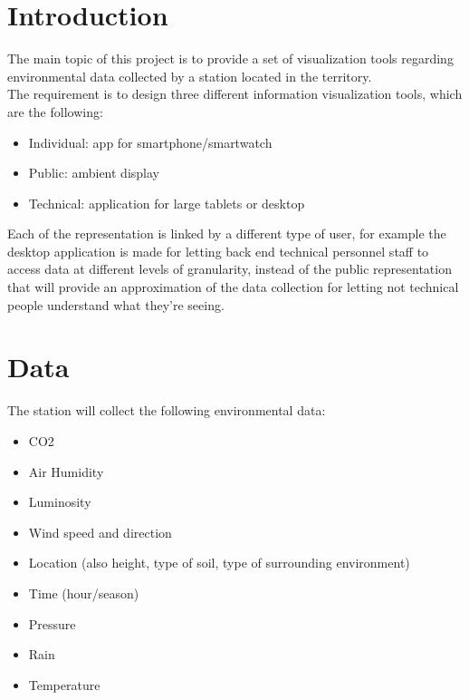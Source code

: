\documentclass[12pt]{article} %
\begin{document}



\tableofcontents %

\newpage %


\section{Introduction} %
The main topic of this project is to provide a set of visualization tools regarding environmental data collected by a station located in the territory.\\
The requirement is to design three different information visualization tools, which are the following:
\begin{itemize}
\item Individual: app for smartphone/smartwatch
\item Public: ambient display
\item Technical: application for large tablets or desktop
\end{itemize}
Each of the representation is linked by a different type of user, for example the desktop application is made for  letting back end technical personnel  staff to access data at different levels of granularity, instead of the public representation that will provide an approximation of the data collection for letting not technical people understand what they're seeing.\\
\section{Data}
The station will collect the following environmental data:
\begin{itemize}
\item CO2
\item Air Humidity
\item Luminosity
\item Wind speed and direction 
\item Location (also height, type of soil, type of surrounding environment)
\item Time (hour/season)
\item Pressure
\item Rain
\item Temperature
\end{itemize} 
\end{document}
